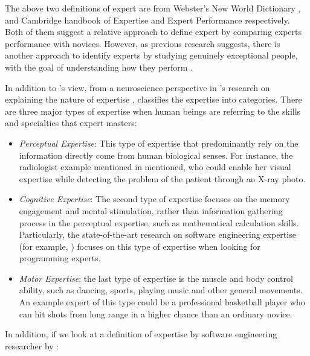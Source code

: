 The above two definitions of expert are from Webster's New World Dictionary \cite{guralnik1983webster}, and Cambridge handbook of Expertise and Expert Performance \cite{ericsson2006cambridge} respectively. Both of them suggest a relative approach to define expert by comparing experts performance with novices. However, as previous research suggests, there is another approach to identify experts by studying genuinely exceptional people, with the goal of understanding how they perform \cite{chi2006two}.

In addition to \citeauthor{ericsson2006cambridge}'s view, from a neuroscience perspective in \citeauthor{bilalić2017neuroscience}'s research on explaining the nature of expertise \cite{bilalić2017neuroscience}, \citeauthor{bilalić2017neuroscience} classifies the expertise into categories. There are three major types of expertise when human beings are referring to the skills and specialties that expert masters:

\begin{itemize}
\item \textit{Perceptual Expertise}: This type of expertise that predominantly rely on the information directly come from human biological senses. For instance, the radiologist example mentioned in \citeauthor{bilalić2017neuroscience} mentioned, who could enable her visual expertise while detecting the problem of the patient through an X-ray photo.
\item \textit{Cognitive Expertise}: The second type of expertise focuses on the memory engagement and mental stimulation, rather than information gathering process in the perceptual expertise, such as mathematical calculation skills. Particularly, the state-of-the-art research on software engineering expertise (for example, \cite{Anvik2006who, mcdonald2000expertise, mockus2002expertise, fritz2010degree, yu2016reviewer, costa2016tipmerge}) focuses on this type of expertise when looking for programming experts.
\item \textit{Motor Expertise}: the last type of expertise is the muscle and body control ability, such as dancing, sports, playing music and other general movements. An example expert of this type could be a professional basketball player who can hit shots from long range in a higher chance than an ordinary novice.
\end{itemize}

In addition, if we look at a definition of expertise by software engineering researcher by \citeauthor{mockus2002expertise} \cite{mockus2002expertise}: 

